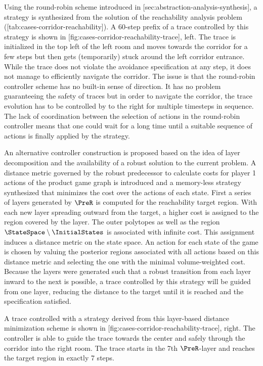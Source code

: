     Using the round-robin scheme introduced in [sec:abstraction-analysis-synthesis], a strategy is synthesized from the solution of the reachability analysis problem ([tab:cases-corridor-reachability]).
    A 60-step prefix of a trace controlled by this strategy is shown in [fig:cases-corridor-reachability-trace], left.
    The trace is initialized in the top left of the left room and moves towards the corridor for a few steps but then gets (temporarily) stuck around the left corridor entrance.
    While the trace does not violate the avoidance specification at any step, it does not manage to efficiently navigate the corridor.
    The issue is that the round-robin controller scheme has no built-in sense of direction.
    It has no problem guaranteeing the safety of traces but in order to navigate the corridor, the trace evolution has to be controlled by  to the right for multiple timesteps in sequence.
    The lack of coordination between the selection of actions in the round-robin controller means that one could wait for a long time until a suitable sequence of actions is finally applied by the strategy.

    An alternative controller construction is proposed based on the idea of layer decomposition and the availability of a robust solution to the current problem.
    A distance metric governed by the robust predecessor to calculate costs for player 1 actions of the product game graph is introduced and a memory-less strategy synthesized that minimizes the cost over the actions of each state.
    First a series of layers generated by $\PreR$ is computed for the reachability target region.
    With each new layer spreading outward from the target, a higher cost is assigned to the region covered by the layer.
    The outer polytopes as well as the region $\StateSpace \setminus \InitialStates$ is associated with infinite cost.
    This assignment induces a distance metric on the state space.
    An action for each state of the game is chosen by valuing the posterior regions associated with all actions based on this distance metric and selecting the one with the minimal volume-weighted cost.
    Because the layers were generated such that a robust transition from each layer inward to the next is possible, a trace controlled by this strategy will be guided from one layer, reducing the distance to the target until it is reached and the specification satisfied.

    A trace controlled with a strategy derived from this layer-based distance minimization scheme is shown in [fig:cases-corridor-reachability-trace], right.
    The controller is able to guide the trace towards the center and safely through the corridor into the right room.
    The trace starts in the 7th $\PreR$-layer and reaches the target region in exactly 7 steps.

